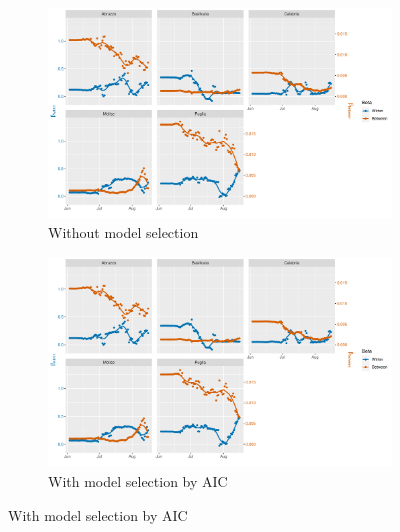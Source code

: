 \documentclass[12pt]{article}
\begin{document}
\begin{appendices}
		\begin{figure}[H]
    	    \centering
    	    \begin{subfigure}{\textwidth}
    	      \centering
    	      \includegraphics[width=0.95\linewidth]{output/model3_lag3_betas_Sud_rolling.pdf}
    	      \caption{Without model selection}
    	      \label{fig:beta_within_between_over_time_sud_regular}
    	    \end{subfigure}\newline
    	    \begin{subfigure}{\textwidth}
    	      \centering
    	      \includegraphics[width=0.95\linewidth]{output/model3_lag3_betas_Sud_aic_rolling.pdf}
    	      \caption{With model selection by AIC}
    	      \label{fig:beta_within_between_over_time_sud_aic}
    	    \end{subfigure}
    	\end{figure}
        \begin{figure}[H]\ContinuedFloat
    	    \begin{subfigure}{\textwidth}
    	      \centering

\end{subfigure}
\end{figure}
\end{appendices}
\end{document}
